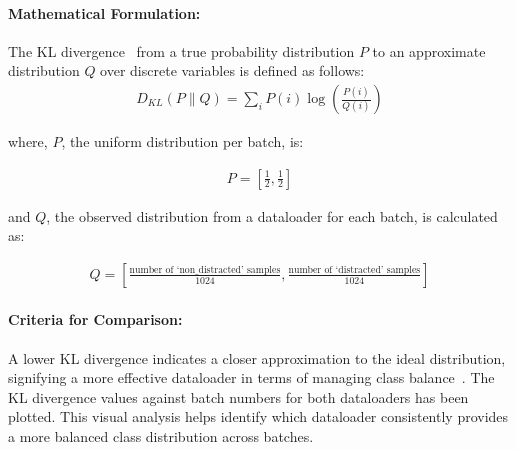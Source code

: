 \paragraph{Mathematical Formulation:}
The KL divergence~\citep{KL_div_kullback1997information} from a true probability distribution \( P \) to an approximate distribution \( Q \) over discrete variables is defined as follows:
\begin{equation}
\begin{aligned}
D_{KL}(P \parallel Q) = \sum_{i} P(i) \log\left(\frac{P(i)}{Q(i)}\right)
\end{aligned}
\label{equation:4.17}
\end{equation}

where, \( P \), the uniform distribution per batch, is:

\begin{equation}
\begin{aligned}
P = \left[\frac{1}{2}, \frac{1}{2}\right]
\end{aligned}
\label{equation:4.18}
\end{equation}

and \( Q \), the observed distribution from a dataloader for each batch, is calculated as:

\begin{equation}
\begin{aligned}
Q = \left[\frac{\text{number of `non\_distracted' samples}}{1024}, \frac{\text{number of `distracted' samples}}{1024}\right]
\end{aligned}
\label{equation:4.19}
\end{equation}

\paragraph{Criteria for Comparison:}
A lower KL divergence indicates a closer approximation to the ideal distribution, signifying a more effective dataloader in terms of managing class balance~\citep{KL_div_kullback1997information}. The KL divergence values against batch numbers for both dataloaders has been plotted. This visual analysis helps identify which dataloader consistently provides a more balanced class distribution across batches.

